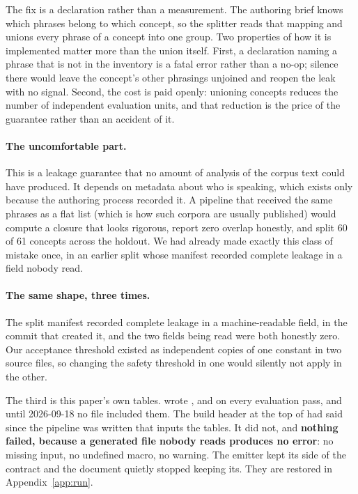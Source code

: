 The fix is a declaration rather than a measurement. The authoring brief knows
which phrases belong to which concept, so the splitter reads that mapping and
unions every phrase of a concept into one group. Two properties of how it is
implemented matter more than the union itself. First, a declaration naming a
phrase that is not in the inventory is a fatal error rather than a no-op;
silence there would leave the concept's other phrasings unjoined and reopen the
leak with no signal. Second, the cost is paid openly: unioning concepts reduces
the number of independent evaluation units, and that reduction is the price of
the guarantee rather than an accident of it.

\paragraph{The uncomfortable part.} This is a leakage guarantee that no amount
of analysis of the corpus text could have produced. It depends on metadata
about who is speaking, which exists only because the authoring process recorded
it. A pipeline that received the same phrases as a flat list (which is how
such corpora are usually published) would compute a closure that looks
rigorous, report zero overlap honestly, and split 60 of 61 concepts across the
holdout. We had already made exactly this class of mistake once, in an earlier
split whose manifest recorded complete leakage in a field nobody read.

\paragraph{The same shape, three times.} The split manifest recorded complete
leakage in a machine-readable field, in the commit that created it, and the two
fields being read were both honestly zero. Our acceptance threshold existed as
independent copies of one constant in two source files, so changing the safety
threshold in one would silently not apply in the other.

The third is this paper's own tables.  wrote
,  and
 on every evaluation pass, and until 2026-09-18 no file
included them. The build header at the top of  had said since
the pipeline was written that  inputs the tables. It did not,
and \textbf{nothing failed, because a generated file nobody reads produces no
error}: no missing input, no undefined macro, no warning. The emitter kept its
side of the contract and the document quietly stopped keeping its. They are
restored in Appendix~\ref{app:run}.

